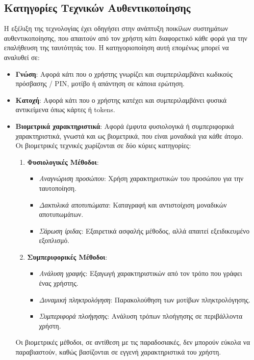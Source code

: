 \subsection{Κατηγορίες Τεχνικών Αυθεντικοποίησης}
Η εξέλιξη της τεχνολογίας έχει οδηγήσει στην ανάπτυξη ποικίλων συστημάτων αυθεντικοποίησης, που απαιτούν από τον χρήστη κάτι διαφορετικό κάθε φορά για την επαλήθευση της ταυτότητάς του. Η κατηγοριοποίηση αυτή επομένως μπορεί να αναλυθεί σε:
\begin{itemize}
    \item \textbf{Γνώση}: Αφορά κάτι που ο χρήστης γνωρίζει και συμπεριλαμβάνει κωδικούς πρόσβασης / PIN, μοτίβο ή απάντηση σε κάποια ερώτηση.
    \item \textbf{Κατοχή}: Αφορά κάτι που ο χρήστης κατέχει και συμπεριλαμβάνει φυσικά αντικείμενα όπως κάρτες ή tokens.
    \item \textbf{Βιομετρικά χαρακτηριστικά}: Αφορά έμφυτα φυσιολογικά ή συμπεριφορικά χαρακτηριστικά, γνωστά και ως βιομετρικά, που είναι μοναδικά για κάθε άτομο. Οι βιομετρικές τεχνικές χωρίζονται σε δύο κύριες κατηγορίες:
\begin{enumerate}
    \item \textbf{Φυσιολογικές Μέθοδοι}:
    \begin{itemize}
        \item \textit{Αναγνώριση προσώπου}: Χρήση χαρακτηριστικών του προσώπου για την ταυτοποίηση.
        \item \textit{Δακτυλικά αποτυπώματα}: Καταγραφή και αντιστοίχιση μοναδικών αποτυπωμάτων.
        \item \textit{Σάρωση ίριδας}: Εξαιρετικά ασφαλής μέθοδος, αλλά απαιτεί εξειδικευμένο εξοπλισμό.
    \end{itemize}
    \item \textbf{Συμπεριφορικές Μέθοδοι}:
    \begin{itemize}
        \item \textit{Ανάλυση γραφής}: Εξαγωγή χαρακτηριστικών από τον τρόπο που γράφει ένας χρήστης.
        \item \textit{Δυναμική πληκτρολόγηση}: Παρακολούθηση των μοτίβων πληκτρολόγησης.
        \item \textit{Συμπεριφορά πλοήγησης}: Ανάλυση τρόπων πλοήγησης σε περιβάλλοντα χρήστη.
    \end{itemize}
\end{enumerate}

Οι βιομετρικές μέθοδοι, σε αντίθεση με τις παραδοσιακές, δεν μπορούν εύκολα να παραβιαστούν, καθώς βασίζονται σε εγγενή χαρακτηριστικά του χρήστη.

\end{itemize}

